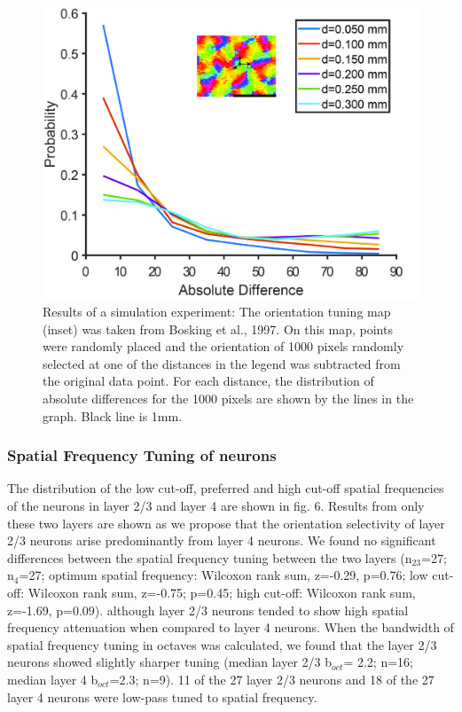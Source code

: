 \begin{figure}[H]
	\centering
	\includegraphics[width=0.6\linewidth]{ShrewV1/simulation.jpg}
	\caption{Results of a simulation experiment: The orientation tuning map (inset) was taken from Bosking et al., 1997. On this map, points were randomly placed and the orientation of 1000 pixels randomly selected at one of the distances in the legend was subtracted from the original data point. For each distance, the distribution of absolute differences for the 1000 pixels are shown by the lines in the graph. Black line is 1mm.}
	\label{fig:sim}
\end{figure}

\subsubsection{Spatial Frequency Tuning of neurons}

The distribution of the low cut-off, preferred and high cut-off spatial
frequencies of the neurons in layer 2/3 and layer 4 are shown in fig. 6.
Results from only these two layers are shown as we propose that the
orientation selectivity of layer 2/3 neurons arise predominantly from
layer 4 neurons. We found no significant differences between the spatial
frequency tuning between the two layers (n$_{23}$=27;
n$_{4}$=27; optimum spatial frequency: Wilcoxon rank sum,
z=-0.29, p=0.76; low cut-off: Wilcoxon rank sum, z=-0.75; p=0.45; high
cut-off: Wilcoxon rank sum, z=-1.69, p=0.09). although layer 2/3 neurons
tended to show high spatial frequency attenuation when compared to layer
4 neurons. When the bandwidth of spatial frequency tuning in octaves was
calculated, we found that the layer 2/3 neurons showed slightly sharper
tuning (median layer 2/3 b$_{oct}$= 2.2; n=16; median layer 4
b$_{oct}$=2.3; n=9). 11 of the 27 layer 2/3 neurons and 18 of
the 27 layer 4 neurons were low-pass tuned to spatial frequency.

